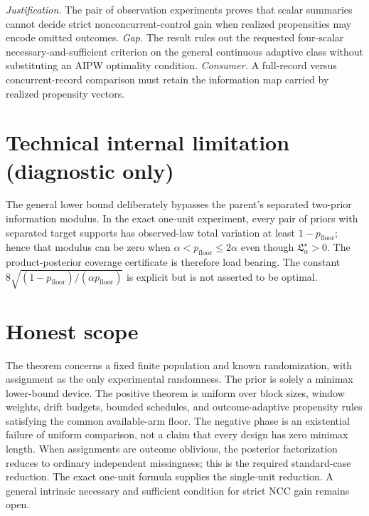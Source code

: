 \documentclass{article}
\begin{document}
\par\smallskip\noindent \textit{Justification.} The pair of observation experiments proves that scalar summaries cannot decide strict nonconcurrent-control gain when realized propensities may encode omitted outcomes. \textit{Gap.} The result rules out the requested four-scalar necessary-and-sufficient criterion on the general continuous adaptive class without substituting an AIPW optimality condition. \textit{Consumer.} A full-record versus concurrent-record comparison must retain the information map carried by realized propensity vectors.

\section*{Technical internal limitation (diagnostic only)}

The general lower bound deliberately bypasses the parent's separated two-prior information modulus. In the exact one-unit experiment, every pair of priors with separated target supports has observed-law total variation at least \(1-p_{\mathrm{floor}}\); hence that modulus can be zero when \(\alpha<p_{\mathrm{floor}}\le2\alpha\) even though \(\mathfrak L_\alpha^\star>0\). The product-posterior coverage certificate is therefore load bearing. The constant \(8\sqrt{(1-p_{\mathrm{floor}})/(\alpha p_{\mathrm{floor}})}\) is explicit but is not asserted to be optimal.

\section{Honest scope}

The theorem concerns a fixed finite population and known randomization, with assignment as the only experimental randomness. The prior is solely a minimax lower-bound device. The positive theorem is uniform over block sizes, window weights, drift budgets, bounded schedules, and outcome-adaptive propensity rules satisfying the common available-arm floor. The negative phase is an existential failure of uniform comparison, not a claim that every design has zero minimax length. When assignments are outcome oblivious, the posterior factorization reduces to ordinary independent missingness; this is the required standard-case reduction. The exact one-unit formula supplies the single-unit reduction. A general intrinsic necessary and sufficient condition for strict NCC gain remains open.
\end{document}
